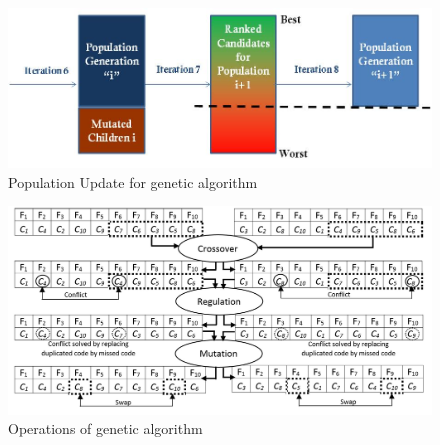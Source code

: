 \documentclass[preprint,12pt]{elsarticle}
\begin{document}
\begin{figure}[h]
\begin{center}
\includegraphics[scale=0.7]{Images/Drawing1.jpg}
\caption{Population Update for genetic algorithm}
\end{center}
\label{Fig2}
\end{figure}
\begin{figure}[h]
\begin{center}
\includegraphics[scale=0.5]{Images/Drawing2.jpg}
\caption{Operations of genetic algorithm}
\end{center}
\label{Fig3}
\end{figure}
\end{document}
